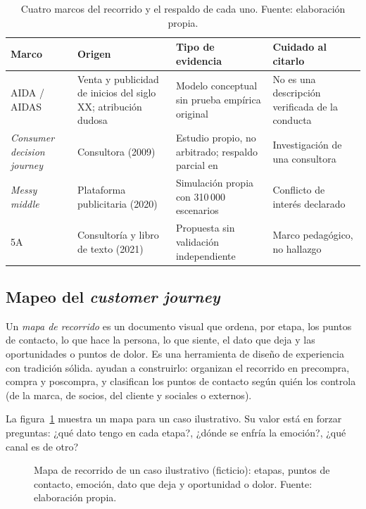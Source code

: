 \begin{table}[!htb]
\centering
\begin{tabular}{@{}p{2.7cm}p{3.2cm}p{3.5cm}p{3.1cm}@{}}
\toprule
Marco & Origen & Tipo de evidencia & Cuidado al citarlo \\
\midrule
AIDA / AIDAS & Venta y publicidad de inicios del siglo XX; atribución dudosa \parencite{iwamoto2024origenaida} & Modelo conceptual sin prueba empírica original & No es una descripción verificada de la conducta \\
\textit{Consumer decision journey} & Consultora (2009) \parencite{court2009consumer} & Estudio propio, no arbitrado; respaldo parcial en \textcite{santos2021consumer} & Investigación de una consultora \\
\textit{Messy middle} & Plataforma publicitaria (2020) \parencite{google2020messy} & Simulación propia con 310\,000 escenarios & Conflicto de interés declarado \\
5A & Consultoría y libro de texto (2021) \parencite{kotler2021marketing50} & Propuesta sin validación independiente & Marco pedagógico, no hallazgo \\
\bottomrule
\end{tabular}
\caption{Cuatro marcos del recorrido y el respaldo de cada uno. Fuente:
elaboración propia.}
\label{tab:cap07-marcos}
\end{table}

\subsection{Mapeo del \textit{customer journey}}
\label{sec:cap07-mapeo}

Un \emph{mapa de recorrido} es un documento visual que ordena, por etapa, los
puntos de contacto, lo que hace la persona, lo que siente, el dato que deja y
las oportunidades o puntos de dolor. Es una herramienta de diseño de
experiencia con tradición sólida. \textcite{lemon2016} ayudan a construirlo:
organizan el recorrido en precompra, compra y poscompra, y clasifican los
puntos de contacto según quién los controla (de la marca, de socios, del
cliente y sociales o externos).

La figura~\ref{fig:cap07-mapa} muestra un mapa para un caso ilustrativo. Su
valor está en forzar preguntas: ¿qué dato tengo en cada etapa?, ¿dónde se
enfría la emoción?, ¿qué canal es de otro?

\begin{figure}[!htb]
  \centering
  \resizebox{\textwidth}{!}{}
  \caption{Mapa de recorrido de un caso ilustrativo (ficticio): etapas, puntos
  de contacto, emoción, dato que deja y oportunidad o dolor. Fuente:
  elaboración propia.}
  \label{fig:cap07-mapa}
\end{figure}

